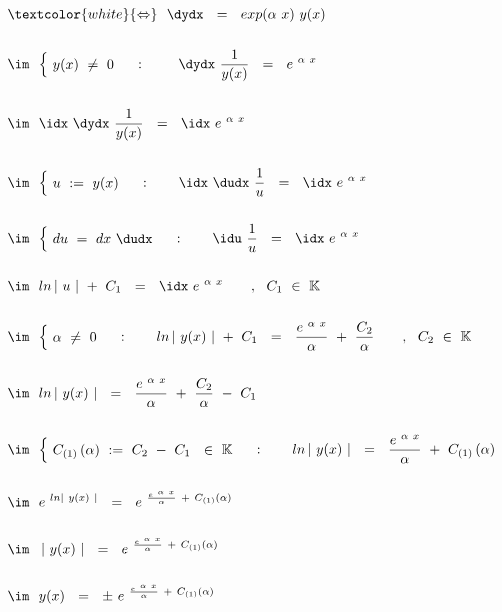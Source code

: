 \begin{enumerate}[leftmargin=*, labelsep=2em, itemsep=3em, label=\alph*)]
	$\begin{aligned}[t]
		&\textcolor{white}{\Leftrightarrow} ~~ \dydx ~~ = ~~ exp(\alpha ~ x) ~ y(x) \\ \\
		&\im ~~ {\begin{cases}
			~ y(x) ~ \neq ~ 0 ~
			\end{cases}} : \qquad ~ \dydx ~ \frac{1}{y(x)} ~~ = ~~ e^{~ \alpha ~ x} \\ \\
		&\im ~~ \idx ~ \dydx ~ \frac{1}{y(x)} ~~ = ~~ \idx ~ e^{~ \alpha ~ x} \\ \\
		&\im ~~ {\begin{cases}
			~ u ~ := ~ y(x) ~
			\end{cases}} : \qquad \idx ~ \dudx ~ \frac{1}{u} ~~ = ~~ \idx ~ e^{~ \alpha ~ x} \\ \\
		&\im ~~ {\begin{cases}
			~ du ~ = ~ dx ~ \dudx ~
			\end{cases}} : \qquad \idu ~ \frac{1}{u} ~~ = ~~ \idx ~ e^{~ \alpha ~ x} \\ \\
		&\im ~~ ln \left| ~ u ~ \right| ~ + ~ C_1 ~~ = ~~ \idx ~ e^{~ \alpha ~ x} \qquad, ~~ C_1 ~ \in ~ \mathbb{K} \\ \\
		&\im ~~ { \begin{cases}
			~ \alpha ~ \neq ~ 0 ~
			\end{cases} } : \qquad ln \left| ~ y(x) ~ \right| ~ + ~ C_1 ~~ = ~~ \frac{ e^{~ \alpha ~ x} }{ \alpha } ~ + ~ \frac{C_2}{\alpha} \qquad, ~~ C_2 ~ \in ~ \mathbb{K} \\ \\
		&\im ~~ ln \left| ~ y(x) ~ \right| ~~ = ~~ \frac{ e^{~ \alpha ~ x} }{ \alpha } ~ + ~ \frac{C_2}{\alpha} ~ - ~ C_1 \\ \\
		&\im ~~ {\begin{cases}
			~ C_{(1)} \left( \alpha \right) ~ := ~ C_2 ~ - ~ C_1 ~~ \in ~ \mathbb{K} ~
			\end{cases}} : \qquad ln \left| ~ y(x) ~ \right| ~~ = ~~ \frac{ e^{~ \alpha ~ x} }{ \alpha } ~ + ~ C_{(1)} \left( \alpha \right) \\ \\
		&\im ~~ e^{~ ln \left| ~ y(x) ~ \right|} ~~ = ~~ e^{~ \frac{ e^{~ \alpha ~ x} }{ \alpha } ~ + ~  C_{(1)} \left( \alpha \right)} \\ \\
		&\im ~~ \left| ~ y(x) ~ \right| ~~ = ~~ e^{~ \frac{ e^{~ \alpha ~ x} }{ \alpha } ~ + ~  C_{(1)} \left( \alpha \right)} \\ \\
		&\im ~~ y(x) ~~ = ~~ \pm ~ e^{~ \frac{ e^{~ \alpha ~ x} }{ \alpha } ~ + ~  C_{(1)} \left( \alpha \right)}
	\end{aligned}$
	

\end{enumerate}
